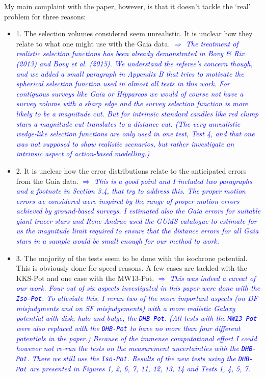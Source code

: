 \documentclass[10pt,a4paper]{article}
\newcommand{\Comment}[1]{\textsl{\textcolor{Blue}{$\Longrightarrow$ {#1}}}}
\begin{document}
My main complaint with the paper, however, is that it doesn't tackle the `real'
problem for three reasons:
\begin{itemize}
\item 1. The selection volumes considered seem unrealistic. It is unclear how they relate to what one might use with the Gaia data. \Comment{The treatment of realistic selection functions has been already demonstrated in Bovy \& Rix (2013) and Bovy et al. (2015). We understand the referee's concern though, and we added a small paragraph in Appendix B that tries to motivate the spherical selection function used in almost all tests in this work. For contiguous surveys like Gaia or Hipparcos we would of course not have a survey volume with a sharp edge and the survey selection function is more likely to be a magnitude cut. But for intrinsic standard candles like red clump stars a magnitude cut translates to a distance cut. (The very unrealistic wedge-like selection functions are only used in one test, Test 4, and that one was not supposed to show realistic scenarios, but rather investigate an intrinsic aspect of action-based modelling.)}\\
\item 2. It is unclear how the error distributions relate to the anticipated errors from the Gaia data. \Comment{This is a good point and I included two paragraphs and a footnote in Section 3.4, that try to address this. The proper motion errors we considered were inspired by the range of proper motion errors achieved by ground-based surveys. I estimated also the Gaia errors for suitable giant tracer stars and Rene Andrae used the GUMS catalogue to estimate for us the magnitude limit required to ensure that the distance errors for all Gaia stars in a sample would be small enough for our method to work.}
\item 3. The majority of the tests seem to be done with the isochrone potential. This is obviously done for speed reasons. A few cases are tackled with the KKS-Pot and one case with the MW13-Pot. \Comment{This was indeed a caveat of our work. Four out of six aspects investigated in this paper were done with the \texttt{Iso-Pot}. To alleviate this, I rerun two of the more important aspects (on DF misjudgments and on SF misjudgements) with a more realistic Galaxy potential with disk, halo and bulge, the \texttt{DHB-Pot}. (All tests with the \texttt{MW13-Pot} were also replaced with the \texttt{DHB-Pot} to have no more than four different potentials in the paper.) Because of the immense computational effort I could however not re-run the tests on the measurement uncertainties with the \texttt{DHB-Pot}. There we still use the \texttt{Iso-Pot}. Results of the new tests using the \texttt{DHB-Pot} are presented in Figures 1, 2, 6, 7, 11, 12, 13, 14 and Tests 1, 4, 5, 7.} \\

\end{itemize}
\end{document}
